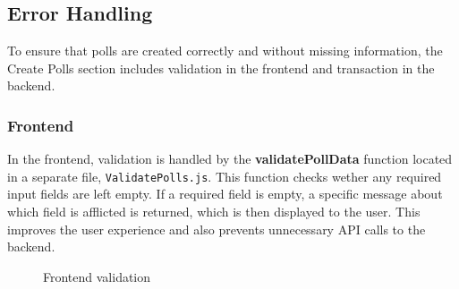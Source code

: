 \documentclass[a4paper,12pt]{report}
\begin{document}
\subsection{Error Handling}
To ensure that polls are created correctly and without missing information, the Create Polls section includes validation in the frontend and transaction in the backend.
\subsubsection{Frontend}
In the frontend, validation is handled by the \textbf{validatePollData} function located in a separate file, \texttt{ValidatePolls.js}. This function checks wether any required input fields are left empty. If a required field is empty, a specific message about which field is afflicted is returned, which is then displayed to the user. This improves the user experience and also prevents unnecessary API calls to the backend.
\begin{figure}[H]
	\caption{Frontend validation}
	\label{fig:validate-poll-data}
\end{figure}
\end{document}
